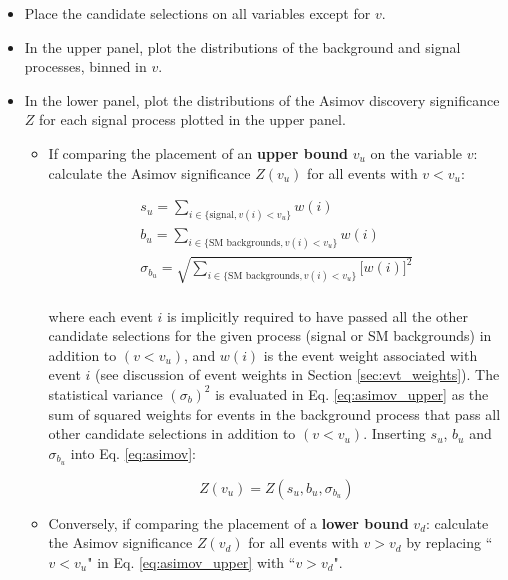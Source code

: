 \begin{itemize} 
\item Place the candidate selections on all variables except for \(v\).
\item In the upper panel, plot the distributions of the background and signal processes, binned in \(v\).
\item In the lower panel, plot the distributions of the Asimov discovery significance \(Z\) for each signal process plotted in the upper panel.
\begin{itemize}
\item If comparing the placement of an \textbf{upper bound} \(v_u\) on the variable \(v\): calculate the Asimov significance \(Z(v_u)\) for all events with \(v<v_u\): 

\begin{equation}
\label{eq:asimov_upper}
\begin{gathered}
s_u = \sum_{i \in \{\text{signal}, v(i) < v_u\}} w(i) \\
b_u =  \sum_{i \in \{\text{SM backgrounds}, v(i) < v_u\}} w(i) \\
\sigma_{b_u} = \sqrt{ \sum_{i \in \{\text{SM backgrounds}, v(i) < v_u\}} \big[w(i)\big]^2 } \\
\end{gathered}
\end{equation}

\noindent where each event \(i\) is implicitly required to have passed all the other candidate selections for the given process (signal or SM backgrounds) in addition to \((v < v_u)\), and \(w(i)\) is the event weight associated with event \(i\) (see discussion of event weights in Section \ref{sec:evt_weights}). The statistical variance \((\sigma_b)^2\) is evaluated in Eq. \ref{eq:asimov_upper} as the sum of squared weights for events in the background process that pass all other candidate selections in addition to \((v < v_u)\). Inserting \(s_u\), \(b_u\) and \(\sigma_{b_u}\) into Eq. \ref{eq:asimov}:

\begin{equation}
\label{eq:asimov_upper}
Z(v_u) = Z(s_u, b_u, \sigma_{b_u} )
\end{equation}

\item Conversely, if comparing the placement of a \textbf{lower bound} \(v_d\): calculate the Asimov significance \(Z(v_d)\) for all events with \(v>v_d\) by replacing ``\(v<v_u\)" in Eq. \ref{eq:asimov_upper} with ``\(v>v_d\)".
\end{itemize}
\end{itemize}

